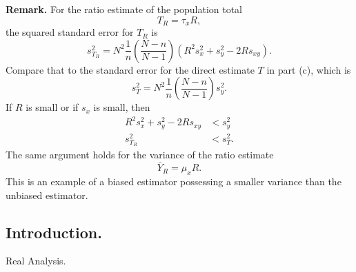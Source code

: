 \documentclass[titlepage]{article}
\begin{document}
\textbf{Remark.} For the ratio estimate of the population total 
$$T_{R} = \tau_{x}R,$$
the squared standard error for $T_{R}$ is 
$$s_{T_{R}}^{2} = N^{2}\frac{1}{n}\left(\frac{N-n}{N-1}\right)(R^{2}s_{x}^{2} + s_{y}^{2} - 2Rs_{xy}).$$
Compare that to the standard error for the direct estimate $T$ in part (c), which is 
$$s_{T}^{2} = N^{2}\frac{1}{n}\left(\frac{N-n}{N-1}\right)s_{y}^{2}.$$
If $R$ is small or if $s_{x}$ is small, then 
\begin{align*}
    R^{2}s_{x}^{2} + s_{y}^{2} - 2Rs_{xy} &< s_{y}^{2} \\
                            s_{T_{R}}^{2} &< s_{T}^{2}.
\end{align*}
The same argument holds for the variance of the ratio estimate 
$$\bar{Y}_{R} = \mu_{x}R.$$
This is an example of a biased estimator possessing a smaller variance than the unbiased estimator.

\newpage {}

\subsection{Introduction.} Real Analysis.
\end{document}
